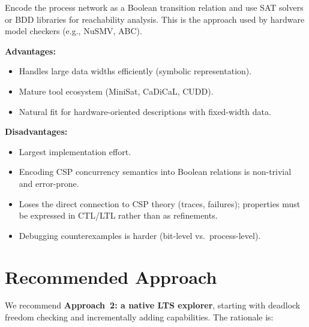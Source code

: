 \documentclass[11pt]{article}
\begin{document}
Encode the process network as a Boolean transition relation and use
SAT solvers or BDD libraries for reachability analysis.  This is the
approach used by hardware model checkers (e.g., NuSMV, ABC).

\textbf{Advantages:}
\begin{itemize}
\item Handles large data widths efficiently (symbolic representation).
\item Mature tool ecosystem (MiniSat, CaDiCaL, CUDD).
\item Natural fit for hardware-oriented descriptions with fixed-width
  data.
\end{itemize}

\textbf{Disadvantages:}
\begin{itemize}
\item Largest implementation effort.
\item Encoding CSP concurrency semantics into Boolean relations is
  non-trivial and error-prone.
\item Loses the direct connection to CSP theory (traces, failures);
  properties must be expressed in CTL/LTL rather than as refinements.
\item Debugging counterexamples is harder (bit-level vs.\ process-level).
\end{itemize}

\section{Recommended Approach}

We recommend \textbf{Approach~2: a native LTS explorer}, starting
with deadlock freedom checking and incrementally adding capabilities.
The rationale is:
\end{document}
